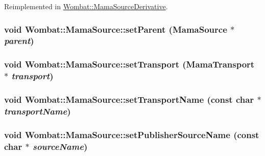 Reimplemented in \hyperlink{classWombat_1_1MamaSourceDerivative_a7fece4c57902446e3a6d6c7383d0dd05}{Wombat::MamaSourceDerivative}.\hypertarget{classWombat_1_1MamaSource_ae2b404a18bf30bef37a6d339645fdfb8}{
\subsubsection[{setParent}]{\setlength{\rightskip}{0pt plus 5cm}void Wombat::MamaSource::setParent ({\bf MamaSource} $\ast$ {\em parent})}}
\label{classWombat_1_1MamaSource_ae2b404a18bf30bef37a6d339645fdfb8}
\hypertarget{classWombat_1_1MamaSource_aad1d0c72704a9f91e1ee83240408cc98}{
\subsubsection[{setTransport}]{\setlength{\rightskip}{0pt plus 5cm}void Wombat::MamaSource::setTransport ({\bf MamaTransport} $\ast$ {\em transport})}}
\label{classWombat_1_1MamaSource_aad1d0c72704a9f91e1ee83240408cc98}
\hypertarget{classWombat_1_1MamaSource_a175f7b0c40ed81f0a69ad5c3f9ced34a}{
\subsubsection[{setTransportName}]{\setlength{\rightskip}{0pt plus 5cm}void Wombat::MamaSource::setTransportName (const char $\ast$ {\em transportName})}}
\label{classWombat_1_1MamaSource_a175f7b0c40ed81f0a69ad5c3f9ced34a}
\hypertarget{classWombat_1_1MamaSource_abc87a3603100603a48d73ddd44f7b120}{
\subsubsection[{setPublisherSourceName}]{\setlength{\rightskip}{0pt plus 5cm}void Wombat::MamaSource::setPublisherSourceName (const char $\ast$ {\em sourceName})}}
\label{classWombat_1_1MamaSource_abc87a3603100603a48d73ddd44f7b120}
